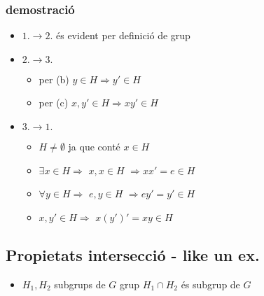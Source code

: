 \documentclass{article}
\begin{document}
\subsubsection{demostració}
\begin{itemize}
\item $1. \to 2.$ és evident per definició de grup
\item $2. \to 3.$
	\begin{itemize}
	\item per (b) $y \in H \Rightarrow y' \in H$
	\item per (c) $x, y' \in H \Rightarrow xy' \in H$
	\end{itemize}
\item $3. \to 1.$
	\begin{itemize}
	\item $H \neq \emptyset$ ja que conté $x \in H$
	\item $\exists x \in H \Rightarrow$ $x, x \in H$ $\Rightarrow xx' = e \in H$
	\item $\forall y \in H \Rightarrow$ $e, y \in H$ $\Rightarrow ey' = y' \in H$
	\item $x, y' \in H \Rightarrow$ $x(y')' = xy \in H$
	\end{itemize}
\end{itemize}
\subsection{Propietats intersecció - like un ex.}
\begin{itemize}
\item $H_1, H_2$ subgrups de $G$ grup
	\subitem $H_1 \cap H_2$ és subgrup de $G$
\end{itemize}
\end{document}
